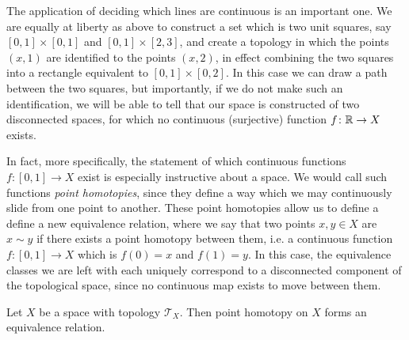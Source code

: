 \documentclass[11pt]{article}
\begin{document}
The application of deciding which lines are continuous is an important one. We are equally at liberty as above to construct a set which is two unit squares, say $[0,1] \times [0,1]$ and $[0,1] \times [2,3]$, and create a topology in which the points $(x,1)$ are identified to the points $(x,2)$, in effect combining the two squares into a rectangle equivalent to $[0,1] \times [0,2]$. In this case we can draw a path between the two squares, but importantly, if we do not make such an identification, we will be able to tell that our space is constructed of two disconnected spaces, for which no continuous (surjective) function $f \colon \mathbb{R} \to X$ exists.

In fact, more specifically, the statement of which continuous functions $f\colon [0,1] \to X$ exist is especially instructive about a space. We would call such functions \emph{point homotopies}, since they define a way which we may continuously slide from one point to another. These point homotopies allow us to define a define a new equivalence relation, where we say that two points $x,y \in X$ are $x \sim y$ if there exists a point homotopy between them, i.e. a continuous function $f\colon [0,1] \to X$ which is $f(0) = x$ and $f(1) = y$. In this case, the equivalence classes we are left with each uniquely correspond to a disconnected component of the topological space, since no continuous map exists to move between them.

\begin{proposition}
Let $X$ be a space with topology $\mathcal{T}_X$. Then point homotopy on $X$ forms an equivalence relation.
\end{proposition}
\end{document}
